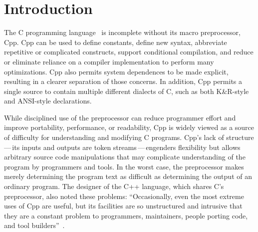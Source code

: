 \documentclass[10pt]{article}
\begin{document}
\bigskip

\section{Introduction}

The C programming language~\cite{KernighanR88,Harbison91} is
incomplete without its macro preprocessor, Cpp.  Cpp can be used to
define constants, define new syntax, abbreviate repetitive or
complicated constructs, support conditional compilation, and 
reduce or eliminate reliance on a compiler implementation to perform 
many optimizations.
Cpp also permits system dependences to be made explicit, resulting in
a clearer separation of those concerns.  In addition, Cpp permits a single
source to contain multiple different dialects of C, such as both
K\&R-style and ANSI-style declarations.



While disciplined use of the preprocessor can reduce programmer effort
and improve portability, performance, or readability, Cpp is widely
viewed as a source of difficulty for understanding and modifying C
programs.  Cpp's lack of structure\,---\,its inputs and outputs are
token streams\,---\,engenders flexibility but allows arbitrary source
code manipulations that may complicate understanding of the program by
programmers and tools.  In the worst case, the preprocessor makes
merely determining the program text as difficult as determining the
output of an ordinary program.  The designer of the C++ language,
which shares C's preprocessor, also noted these problems:
``Occasionally, even the most extreme uses of Cpp are useful, but its
facilities are so unstructured and intrusive that they are a constant
problem to programmers, maintainers, people porting code, and tool
builders''~\cite[p.~424]{Stroustrup-DesignEvolution}.
\end{document}
